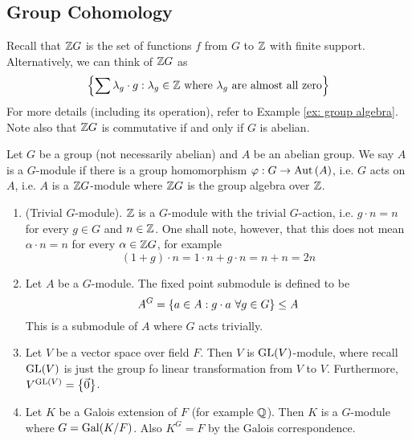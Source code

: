 \newpage
\subsection{Group Cohomology}
Recall that ${\mathbb Z} G$ is the set of functions $f$ from $G$ to ${\mathbb Z}$ with finite support. Alternatively, we can think of ${\mathbb Z} G$ as 
\[\left\{\sum \lambda_g \cdot g:\lambda_g \in {\mathbb Z}\text{ where $\lambda_g$ are almost all zero}\right\}\]
For more details (including its operation), refer to Example \ref{ex: group algebra}. Note also that ${\mathbb Z} G$ is commutative if and only if $G$ is abelian.

\medskip

\begin{defn} [$G$-module]
    Let $G$ be a group (not necessarily abelian) and $A$ be an abelian group. We say $A$ is a $G$-module if there is a group homomorphism $\varphi:G\to \operatorname{Aut}\left(A\right)$, i.e. $G$ acts on $A$, i.e. $A$ is a ${\mathbb Z} G$-module where ${\mathbb Z} G$ is the group algebra over ${\mathbb Z}$.
\end{defn}

\medskip

\begin{ex}
    \hfill

    \begin{enumerate}
        \item (Trivial $G$-module). ${\mathbb Z}$ is a $G$-module with the trivial $G$-action, i.e. $g\cdot n = n$ for every $g\in G$ and $n\in {\mathbb Z}$. One shall note, however, that this does not mean $\alpha\cdot n = n$ for every $\alpha \in {\mathbb Z} G$, for example
        \[(1+g)\cdot n = 1\cdot n + g\cdot n = n+n = 2n\]
        \item Let $A$ be a $G$-module. The fixed point submodule is defined to be
        \[A^G = \left\{a\in A : g\cdot a\ \forall g\in G\right\}\leq A\]
        This is a submodule of $A$ where $G$ acts trivially.
        \item Let $V$ be a vector space over field $F$. Then $V$ is $\operatorname{GL}(V)$-module, where recall $\operatorname{GL}(V)$ is just the group fo linear transformation from $V$ to $V$. Furthermore, $V^{\operatorname{GL}(V)}= \left\{\vec 0\right\}$.
        \item Let $K$ be a Galois extension of $F$ (for example ${\mathbb Q}$). Then $K$ is a $G$-module where $G = \operatorname{Gal}(K/F)$. Also $K^G = F$ by the Galois correspondence.
    \end{enumerate}
\end{ex}

\medskip


